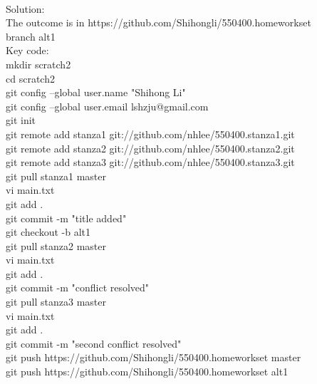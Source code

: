 \documentclass[12pt]{article}
\begin{document}
\noindent\ \\Solution:\\
The outcome is in https://github.com/Shihongli/550400.homeworkset\\
 branch alt1\\
Key code:\\
mkdir scratch2\\
cd scratch2\\
git config --global user.name "Shihong Li"\\
git config --global user.email lshzju@gmail.com\\
git init\\
git remote add stanza1 git://github.com/nhlee/550400.stanza1.git\\
git remote add stanza2 git://github.com/nhlee/550400.stanza2.git\\
git remote add stanza3 git://github.com/nhlee/550400.stanza3.git\\
git pull stanza1 master\\
vi main.txt\\
git add .\\
git commit -m "title added"\\
git checkout -b alt1\\
git pull stanza2 master\\
vi main.txt\\
git add .\\
git commit -m "conflict resolved"\\
git pull stanza3 master\\
vi main.txt\\
git add .\\
git commit -m "second conflict resolved"\\
git push https://github.com/Shihongli/550400.homeworkset master\\
git push https://github.com/Shihongli/550400.homeworkset alt1\\
\end{document}
